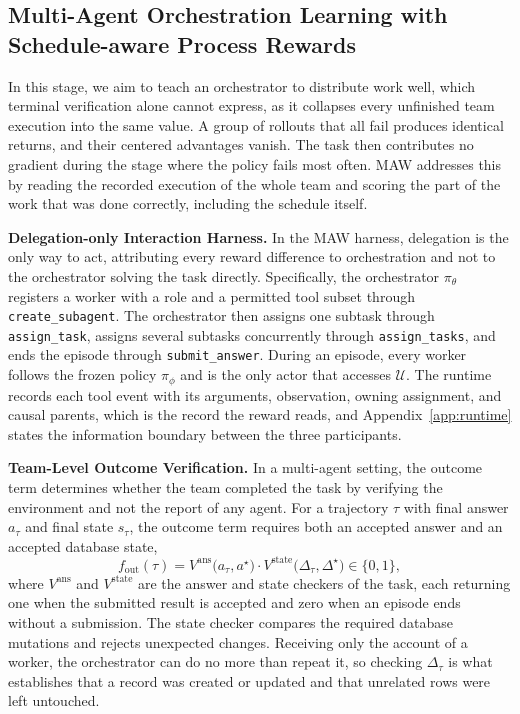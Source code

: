 \subsection{Multi-Agent Orchestration Learning with Schedule-aware Process Rewards}
\label{sec:learning}

In this stage, we aim to teach an orchestrator to distribute work well, which terminal verification alone cannot express, as it collapses every unfinished team execution into the same value.
A group of rollouts that all fail produces identical returns, and their centered advantages vanish.
The task then contributes no gradient during the stage where the policy fails most often.
MAW addresses this by reading the recorded execution of the whole team and scoring the part of the work that was done correctly, including the schedule itself.

\textbf{Delegation-only Interaction Harness.}\quad
In the MAW harness, delegation is the only way to act, attributing every reward difference to orchestration and not to the orchestrator solving the task directly.
Specifically, the orchestrator $\pi_\theta$ registers a worker with a role and a permitted tool subset through \texttt{create\_subagent}.
The orchestrator then assigns one subtask through \texttt{assign\_task}, assigns several subtasks concurrently through \texttt{assign\_tasks}, and ends the episode through \texttt{submit\_answer}.
During an episode, every worker follows the frozen policy $\pi_\phi$ and is the only actor that accesses $\mathcal{U}$.
The runtime records each tool event with its arguments, observation, owning assignment, and causal parents, which is the record the reward reads, and Appendix~\ref{app:runtime} states the information boundary between the three participants.

\textbf{Team-Level Outcome Verification.}\quad
In a multi-agent setting, the outcome term determines whether the team completed the task by verifying the environment and not the report of any agent.
For a trajectory $\tau$ with final answer $a_\tau$ and final state $s_\tau$, the outcome term requires both an accepted answer and an accepted database state,
\begin{equation}
f_{\mathrm{out}}(\tau)=V^{\mathrm{ans}}\bigl(a_\tau,a^{\star}\bigr)\cdot V^{\mathrm{state}}\bigl(\Delta_\tau,\Delta^{\star}\bigr)\in\{0,1\},
\label{eq:outcome}
\end{equation}
where $V^{\mathrm{ans}}$ and $V^{\mathrm{state}}$ are the answer and state checkers of the task, each returning one when the submitted result is accepted and zero when an episode ends without a submission.
The state checker compares the required database mutations and rejects unexpected changes.
Receiving only the account of a worker, the orchestrator can do no more than repeat it, so checking $\Delta_\tau$ is what establishes that a record was created or updated and that unrelated rows were left untouched.



